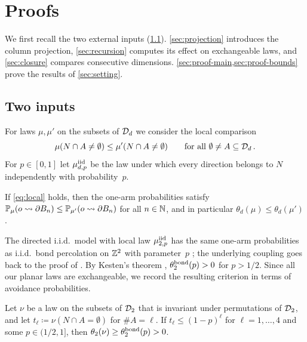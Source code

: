 \documentclass[11pt,letterpaper]{article}
\begin{document}
\section{Proofs}\label{sec:proofs}

We first recall the two external inputs (\cref{sec:inputs}). \cref{sec:projection} introduces the column projection, \cref{sec:recursion} computes its effect on exchangeable laws, and \cref{sec:closure} compares consecutive dimensions. \cref{sec:proof-main,sec:proof-bounds} prove the results of \cref{sec:setting}.

\subsection{Two inputs}\label{sec:inputs}

For laws $\mu,\mu'$ on the subsets of $\cD_d$ we consider the local comparison
\begin{equation}\label{eq:local}
\mu(N\cap A\neq\emptyset)\le\mu'(N\cap A\ne\emptyset)\qquad\text{for all }\emptyset\ne A\subseteq\cD_d\,.
\end{equation}
For $p\in[0,1]$ let $\mu^\iid_{d,p}$ be the law under which every direction belongs to $N$ independently with probability~$p$.

\begin{theorem}\label{thm:l2g}
If \cref{eq:local} holds, then the one-arm probabilities satisfy $\P_\mu(o\rightsquigarrow\partial B_n)\le\P_{\mu'}(o\rightsquigarrow\partial B_n)$ for all $n\in\N$, and in particular $\theta_d(\mu)\le\theta_d(\mu')$.
\end{theorem}

The directed i.i.d.\ model with local law $\mu^\iid_{2,p}$ has the same one-arm probabilities as i.i.d.\ bond percolation on $\Z^2$ with parameter~$p$ \cite[Lemma~3.5]{BJKLRT25}; the underlying coupling goes back to the proof of \cite[Lemma~2.5]{CHJK26}. By Kesten's theorem \cite{Kes80}, $\theta^\bond_2(p)>0$ for $p>1/2$. Since all our planar laws are exchangeable, we record the resulting criterion in terms of avoidance probabilities.

\begin{lemma}\label{lem:planar}
Let $\nu$ be a law on the subsets of $\cD_2$ that is invariant under permutations of $\cD_2$, and let $t_\ell\coloneqq\nu(N\cap A=\emptyset)$ for $\#A=\ell$. If $t_\ell\le(1-p)^\ell$ for $\ell=1,\dots,4$ and some $p\in(1/2,1]$, then $\theta_2(\nu)\ge\theta^\bond_2(p)>0$.
\end{lemma}
\end{document}
